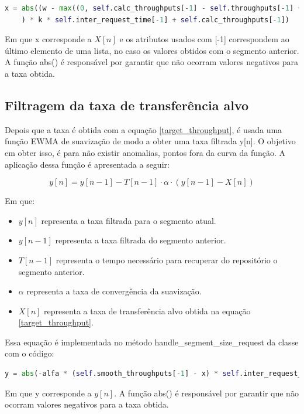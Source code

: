 \documentclass[10pt,twocolumn,letterpaper]{article}
\begin{document}
\begin{lstlisting}[language=python]
	x = abs((w - max((0, self.calc_throughputs[-1] - self.throughputs[-1] + w))
	) * k * self.inter_request_time[-1] + self.calc_throughputs[-1])
\end{lstlisting}

Em que x corresponde a $X[n]$ e os atributos usados com [-1] correspondem ao último elemento de uma lista, no caso os valores obtidos com o segmento anterior. A função abs() é responsável por garantir que não ocorram valores negativos para a taxa obtida.

\subsection{Filtragem da taxa de transferência alvo}
Depois que a taxa é obtida com a equação \ref{target_throughput}, é usada uma função EWMA de suavização de modo a obter uma taxa filtrada y[n]. O objetivo em obter isso, é para não existir anomalias, pontos fora da curva da função. A aplicação dessa função é apresentada a seguir:

\begin{equation} \label{smooth_throughput}
	y[n] = y[n-1] - T[n-1] \cdot \alpha \cdot (y[n-1] - X[n])
\end{equation}

Em que: 
\begin{itemize}
	\item $y[n]$ representa a taxa filtrada para o segmento atual.
	\item $y[n-1]$ representa a taxa filtrada do segmento anterior.
	\item $T[n-1]$ representa o tempo necessário para recuperar do repositório o segmento anterior.
	\item $\alpha$ representa a taxa de convergência da suavização.
	\item $X[n]$ representa a taxa de transferência alvo obtida na equação \ref{target_throughput}.
\end{itemize}

Essa equação é implementada no método handle\_segment\_size\_request da classe com o código:

\begin{lstlisting}[language=python]
	y = abs(-alfa * (self.smooth_throughputs[-1] - x) * self.inter_request_time[-1] + self.smooth_throughputs[-1])
\end{lstlisting}

Em que y corresponde a $y[n]$. A função abs() é responsável por garantir que não ocorram valores negativos para a taxa obtida.
\end{document}
